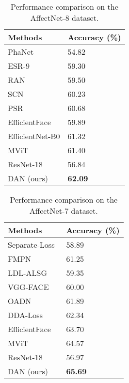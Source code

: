 \documentclass{article}
\begin{document}
 \begin{table}[]
\caption{Performance comparison on the AffectNet-8 dataset.}
\label{table:affectnet8}
\begin{tabularx}{\textwidth}{CC}
    \toprule
	\textbf{Methods}        & \textbf{Accuracy (\%)}\\ 
	\midrule
    PhaNet~\cite{liu2019pose}                 & 54.82      \\
    ESR-9~\cite{siqueira2020efficient}        & 59.30        \\
    RAN~\cite{wang2020region}             & 59.50            \\
    SCN~\cite{wang2020suppressing}            & 60.23         \\
    PSR~\cite{vo2020pyramid}                & 60.68         \\
    EfficientFace~\cite{zhao2021robust}  & 59.89            \\
    EfficientNet-B0 \cite{savchenko2021facial}  & 61.32         \\
    MViT~\cite{li2021mvit}            & 61.40                        \\
	\midrule
    ResNet-18                   & 56.84         \\
    DAN (ours)                  & \textbf{{62.09} }         \\
    \bottomrule
\end{tabularx}

\end{table}



\begin{table}[]
\caption{Performance comparison on the AffectNet-7 dataset.}
\label{table:affectnet7}
\begin{tabularx}{\textwidth}{CC}
    \toprule
	\textbf{Methods}        & \textbf{Accuracy (\%)} \\ 
	\midrule
	Separate-Loss~\cite{li2019separate}          & 58.89        \\
	FMPN~\cite{chen2019facial}                   & 61.25        \\
	LDL-ALSG~\cite{chen2020label}                 & 59.35         \\
	VGG-FACE~\cite{kollias2020deep}               & 60.00          \\
	OADN~\cite{ding2020occlusion}                 & 61.89         \\
    DDA-Loss~\cite{farzaneh2020discriminant}       & 62.34       \\   
    EfficientFace~\cite{zhao2021robust}         &  63.70    \\
    MViT~\cite{li2021mvit}                     & 64.57      \\
	\midrule
    ResNet-18                 & 56.97         \\
    DAN (ours)                  & \textbf{{65.69} }         \\
    \bottomrule
\end{tabularx}
\end{table}
\end{document}
